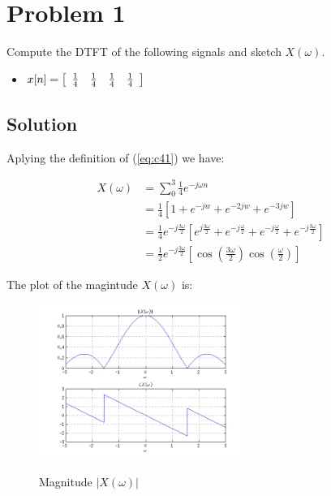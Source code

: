 \section*{Problem 1}

Compute the DTFT of the following signals and sketch $X(\omega)$.

\begin{itemize}
\item 
$x[n] =
\left[
\begin{array}{c c c c}
 \frac{1}{4}&  \frac{1}{4}& \frac{1}{4}& \frac{1}{4}
 \end{array}
 \right]
$
\end{itemize} 

\subsection*{Solution}

Aplying the definition of (\ref{eq:c41}) we have:

\begin{equation}
\begin{aligned}
X(\omega) &= \displaystyle\sum_{0}^{3} \frac{1}{4} e^{-j \omega n} \\
&= \frac{1}{4} [1 + e^{-jw} + e^{-2jw} + e^{-3jw}] \\
&= \frac{1}{4} e^{-j \frac{3 \omega}{2}}
		[e^{j \frac{3 \omega}{2}} + e^{-j \frac{\omega}{2}} + 
		 e^{- j \frac{\omega}{2}} + e^{-j \frac{3 \omega}{2}} ] \\
&= \frac{1}{2}  e^{-j \frac{3 \omega}{2}} [\cos(\frac{3 \omega}{2})\cos(\frac{\omega}{2})]
\end{aligned}
\label{eq:c4p1a}
\end{equation} 

The plot of the magintude $X(\omega)$ is:

\begin{figure}[H]
\caption{Magnitude $|X(\omega)|$}
\centering
\includegraphics[width=0.6\textwidth]{figs/c4p1a.png}
\label{fig:c4p1a}
\end{figure} 


